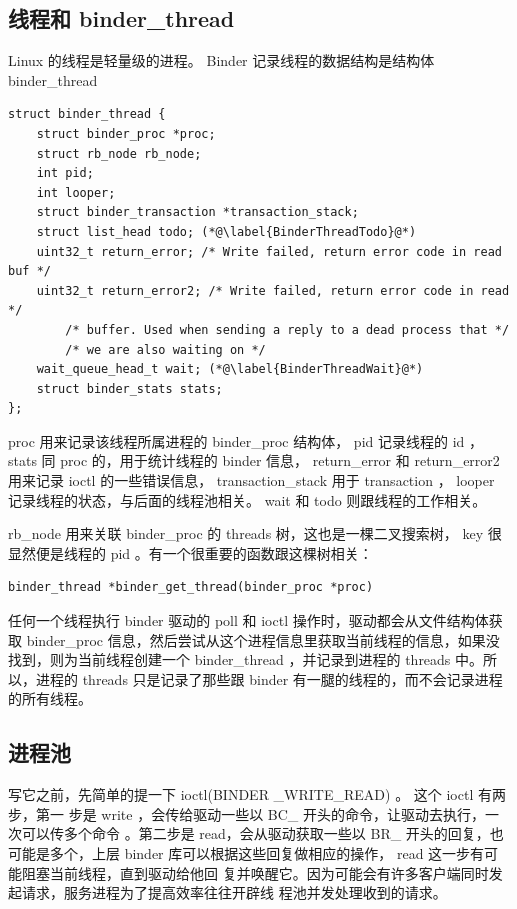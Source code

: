 \documentclass[a4paper,11pt]{article}
\begin{document}
\subsection{线程和 binder_thread}
Linux 的线程是轻量级的进程。 Binder 记录线程的数据结构是结构体 binder_thread
\begin{lstlisting}
struct binder_thread {
	struct binder_proc *proc;
	struct rb_node rb_node;
	int pid;
	int looper;
	struct binder_transaction *transaction_stack;
	struct list_head todo; (*@\label{BinderThreadTodo}@*)
	uint32_t return_error; /* Write failed, return error code in read buf */
	uint32_t return_error2; /* Write failed, return error code in read */
		/* buffer. Used when sending a reply to a dead process that */
		/* we are also waiting on */
	wait_queue_head_t wait; (*@\label{BinderThreadWait}@*)
	struct binder_stats stats;
};
\end{lstlisting}

 proc 用来记录该线程所属进程的 binder_proc 结构体， pid 记录线程的 id ， stats
同 proc 的，用于统计线程的 binder 信息， return_error 和 return_error2 用来记录
ioctl 的一些错误信息， transaction_stack 用于 transaction ， looper
记录线程的状态，与后面的线程池相关。 wait 和 todo 则跟线程的工作相关。

 rb_node 用来关联 binder_proc 的 threads 树，这也是一棵二叉搜索树， key
很显然便是线程的 pid 。有一个很重要的函数跟这棵树相关：
\begin{lstlisting}
binder_thread *binder_get_thread(binder_proc *proc)
\end{lstlisting}

任何一个线程执行 binder 驱动的 poll 和 ioctl 操作时，驱动都会从文件结构体获取
binder_proc 信息，然后尝试从这个进程信息里获取当前线程的信息，如果没找到，则为当前线程创建一个
binder_thread ，并记录到进程的 threads 中。所以，进程的 threads
只是记录了那些跟 binder 有一腿的线程的，而不会记录进程的所有线程。

\subsection{进程池}\label{BinderThreadPool}
写它之前，先简单的提一下 ioctl(BINDER _WRITE_READ) 。 这个 ioctl 有两步，第一
步是 write ，会传给驱动一些以 BC_ 开头的命令，让驱动去执行，一次可以传多个命令
。第二步是 read，会从驱动获取一些以 BR_ 开头的回复，也可能是多个，上层 binder
库可以根据这些回复做相应的操作， read 这一步有可能阻塞当前线程，直到驱动给他回
复并唤醒它。因为可能会有许多客户端同时发起请求，服务进程为了提高效率往往开辟线
程池并发处理收到的请求。
\end{document}
